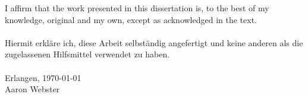 I affirm that the work presented in this dissertation is, to the best of my
knowledge, original and my own, except as acknowledged in the
text. \\
\\
Hiermit erkläre ich, diese Arbeit selbständig angefertigt und keine anderen
als die zugelassenen Hilfsmittel verwendet zu haben.
\\
\hfill\\[1cm]
Erlangen, \today
\hfill\\[1cm]
Aaron Webster
\vspace{2cm}

\newpage
